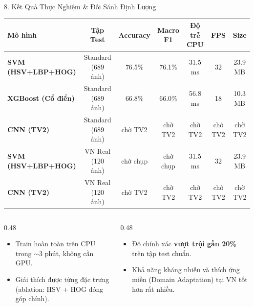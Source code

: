\documentclass[aspectratio=169, 10pt]{beamer}
\begin{document}
\begin{frame}{8. Kết Quả Thực Nghiệm \& Đối Sánh Định Lượng}
\centering
\small
\begin{tabular}{lcccccc}
  \toprule
  \textbf{Mô hình} & \textbf{Tập Test} & \textbf{Accuracy} & \textbf{Macro F1} & \textbf{Độ trễ CPU} & \textbf{FPS} & \textbf{Size} \\
  \midrule
  \textbf{SVM (HSV+LBP+HOG)} & Standard (689 ảnh) & 76.5\% & 76.1\% & 31.5 ms & 32 & 23.9 MB \\
  \textbf{XGBoost (Cổ điển)} & Standard (689 ảnh) & 66.8\% & 66.0\% & 56.8 ms & 18 & 10.3 MB \\
  \textbf{CNN (TV2)} & Standard (689 ảnh) & \alert{chờ TV2} & \alert{chờ TV2} & \alert{chờ TV2} & \alert{chờ TV2} & \alert{chờ TV2} \\
  \midrule
  \textbf{SVM (HSV+LBP+HOG)} & VN Real (120 ảnh) & \alert{chờ chụp} & \alert{chờ chụp} & 31.5 ms & 32 & 23.9 MB \\
  \textbf{CNN (TV2)} & VN Real (120 ảnh) & \alert{chờ TV2} & \alert{chờ TV2} & \alert{chờ TV2} & \alert{chờ TV2} & \alert{chờ TV2} \\
  \bottomrule
\end{tabular}

\vspace{0.3cm}
\begin{columns}[T]
  \begin{column}{0.48\textwidth}
    \begin{tcolorbox}[colback=UITBlue!5, colframe=UITBlue, title=\footnotesize \textbf{Ưu thế của Nhánh Cổ điển (TV1)}]
      \begin{itemize}\footnotesize
        \item Train hoàn toàn trên CPU trong $\sim$3 phút, không cần GPU.
        \item Giải thích được từng đặc trưng (ablation: HSV + HOG đóng góp chính).
      \end{itemize}
    \end{tcolorbox}
  \end{column}

  \begin{column}{0.48\textwidth}
    \begin{tcolorbox}[colback=GreenRecycle!5, colframe=GreenRecycle, title=\footnotesize \textbf{Ưu thế của Nhánh Học sâu (TV2)}]
      \begin{itemize}\footnotesize
        \item Độ chính xác \textbf{vượt trội gần 20\%} trên tập test chuẩn.
        \item Khả năng kháng nhiễu và thích ứng miền (Domain Adaptation) tại VN tốt hơn rất nhiều.
      \end{itemize}
    \end{tcolorbox}
  \end{column}
\end{columns}
\end{frame}
\end{document}
